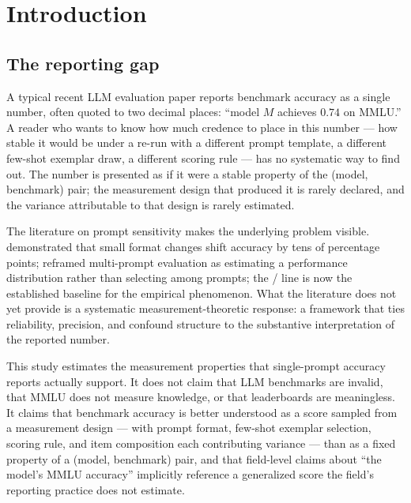 \documentclass[11pt]{article}
\begin{document}

\section{Introduction}
\label{sec:intro}

\subsection{The reporting gap}
\label{sec:reporting-gap}

A typical recent LLM evaluation paper reports benchmark accuracy as a single number, often quoted to two decimal places: ``model $M$ achieves $0.74$ on MMLU.'' A reader who wants to know how much credence to place in this number --- how stable it would be under a re-run with a different prompt template, a different few-shot exemplar draw, a different scoring rule --- has no systematic way to find out. The number is presented as if it were a stable property of the (model, benchmark) pair; the measurement design that produced it is rarely declared, and the variance attributable to that design is rarely estimated.

The literature on prompt sensitivity makes the underlying problem visible. \citet{sclar2023quantifying} demonstrated that small format changes shift accuracy by tens of percentage points; \citet{polo2024efficient} reframed multi-prompt evaluation as estimating a performance distribution rather than selecting among prompts; the \citet{sclar2023quantifying} / \citet{polo2024efficient} line is now the established baseline for the empirical phenomenon. What the literature does not yet provide is a systematic measurement-theoretic response: a framework that ties reliability, precision, and confound structure to the substantive interpretation of the reported number.

This study estimates the measurement properties that single-prompt accuracy reports actually support. It does not claim that LLM benchmarks are invalid, that MMLU does not measure knowledge, or that leaderboards are meaningless. It claims that benchmark accuracy is better understood as a score sampled from a measurement design --- with prompt format, few-shot exemplar selection, scoring rule, and item composition each contributing variance --- than as a fixed property of a (model, benchmark) pair, and that field-level claims about ``the model's MMLU accuracy'' implicitly reference a generalized score the field's reporting practice does not estimate.
\end{document}
